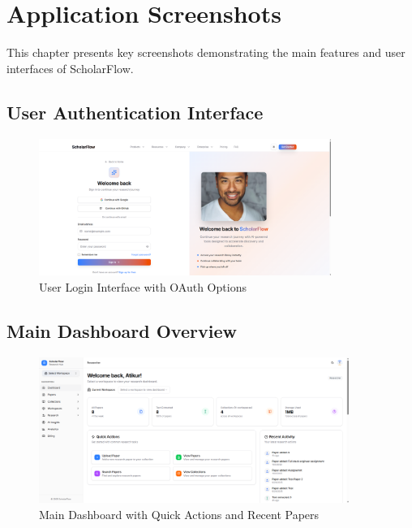 \chapter{Application Screenshots}
\label{ch:screenshots}

This chapter presents key screenshots demonstrating the main features and user interfaces of ScholarFlow.

\section{User Authentication Interface}
\label{sec:auth-screenshots}

\begin{figure}[H]
\centering
\includegraphics[width=0.85\textwidth]{images/screenshots/sign_in.png}
\caption{User Login Interface with OAuth Options}
\label{fig:ss-login}
\end{figure}

\section{Main Dashboard Overview}

\begin{figure}[H]
\centering
\includegraphics[width=0.9\textwidth]{images/screenshots/dashboard_overview.png}
\caption{Main Dashboard with Quick Actions and Recent Papers}
\label{fig:ss-dashboard}
\end{figure}

